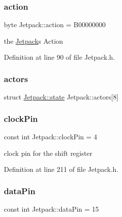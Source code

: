 \subsubsection{\texorpdfstring{action}{action}}
{\footnotesize\ttfamily byte Jetpack\+::action = B00000000\hspace{0.3cm}{\ttfamily [private]}}

the \hyperlink{class_jetpack}{Jetpack}\textquotesingle{}s Action 

Definition at line 90 of file Jetpack.\+h.

\mbox{\label{class_jetpack_a7e16d2f97837f9712a2e6de1c50d99db}} 
\subsubsection{\texorpdfstring{actors}{actors}}
{\footnotesize\ttfamily struct \hyperlink{struct_jetpack_1_1state}{Jetpack\+::state} Jetpack\+::actors\mbox{[}8\mbox{]}\hspace{0.3cm}{\ttfamily [private]}}

\mbox{\label{class_jetpack_a58ebb991f358f3ae94e82148b0221b5a}} 
\subsubsection{\texorpdfstring{clock\+Pin}{clockPin}}
{\footnotesize\ttfamily const int Jetpack\+::clock\+Pin = 4\hspace{0.3cm}{\ttfamily [private]}}

clock pin for the shift register 

Definition at line 211 of file Jetpack.\+h.

\mbox{\label{class_jetpack_a3d669a56e93c71dd25f970d4ed7d0c00}} 
\subsubsection{\texorpdfstring{data\+Pin}{dataPin}}
{\footnotesize\ttfamily const int Jetpack\+::data\+Pin = 15\hspace{0.3cm}{\ttfamily [private]}}

